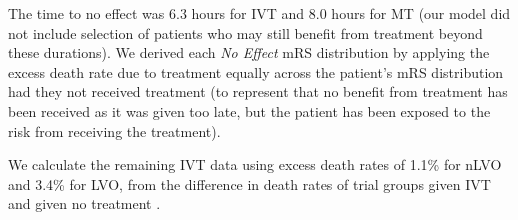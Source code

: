 The time to no effect was 6.3 hours for IVT \cite{emberson_effect_2014} and 8.0 hours for MT \cite{ fransen_time_2016} (our model did not include selection of patients who may still benefit from treatment beyond these durations). We derived each \textit{No Effect} mRS distribution by applying the excess death rate due to treatment equally across the patient’s mRS distribution had they not received treatment (to represent that no benefit from treatment has been received as it was given too late, but the patient has been exposed to the risk from receiving the treatment).

We calculate the remaining IVT data using excess death rates of 1.1\% for nLVO and 3.4\% for LVO, from the difference in death rates of trial groups given IVT and given no treatment \cite{emberson_effect_2014}.
